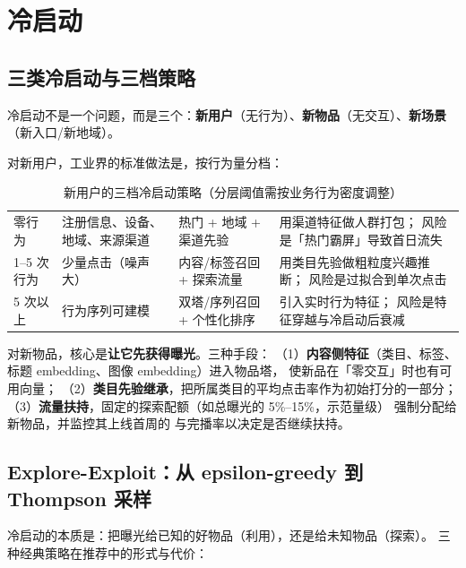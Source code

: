 \section{冷启动}

\subsection{三类冷启动与三档策略}

冷启动不是一个问题，而是三个：\textbf{新用户}（无行为）、\textbf{新物品}（无交互）、\textbf{新场景}（新入口/新地域）。

对新用户，工业界的标准做法是，按行为量分档：

\begin{table}[htbp]
\centering
\caption{新用户的三档冷启动策略（分层阈值需按业务行为密度调整）}
\label{tab:coldstart}
\small
\begin{tabularx}{\textwidth}{L{2.0cm} L{2.6cm} L{2.0cm} Y}
\toprule
{} &  &  &  \\
\midrule
零行为 & 注册信息、设备、地域、来源渠道 & 热门 + 地域 + 渠道先验 & 用渠道特征做人群打包；
风险是「热门霸屏」导致首日流失 \\
1--5 次行为 & 少量点击（噪声大） & 内容/标签召回 + 探索流量 & 用类目先验做粗粒度兴趣推断；
风险是过拟合到单次点击 \\
5 次以上 & 行为序列可建模 & 双塔/序列召回 + 个性化排序 & 引入实时行为特征；
风险是特征穿越与冷启动后衰减 \\
\bottomrule
\end{tabularx}
\end{table}

对新物品，核心是\textbf{让它先获得曝光}。三种手段：
（1）\textbf{内容侧特征}（类目、标签、标题 embedding、图像 embedding）进入物品塔，
        使新品在「零交互」时也有可用向量；
（2）\textbf{类目先验继承}，把所属类目的平均点击率作为初始打分的一部分；
（3）\textbf{流量扶持}，固定的探索配额（如总曝光的 5\%--15\%，示范量级）
        强制分配给新物品，并监控其上线首周的  与完播率以决定是否继续扶持。

\subsection{Explore-Exploit：从 epsilon-greedy 到 Thompson 采样}

冷启动的本质是：把曝光给已知的好物品（利用），还是给未知物品（探索）。
三种经典策略在推荐中的形式与代价：

